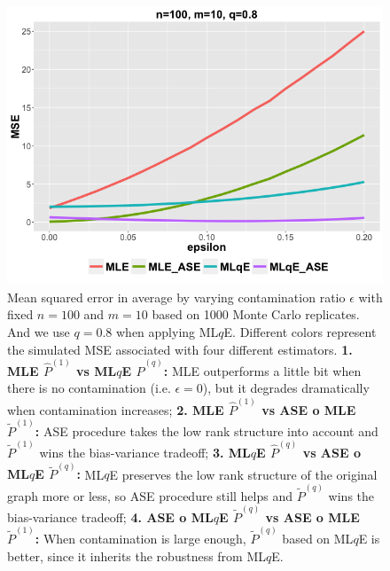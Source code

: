 \documentclass[a4paper]{article}
\begin{document}
\begin{figure}[!htb]
\centering
\includegraphics[width=1\textwidth]{eps.png}
\caption{Mean squared error in average by varying contamination ratio $\epsilon$ with fixed $n = 100$ and $m = 10$ based on 1000 Monte Carlo replicates. And we use $q=0.8$ when applying ML$q$E.
Different colors represent the simulated MSE associated with four different estimators.
\textbf{1. MLE $\hat{P}^{(1)}$ vs ML$q$E $\hat{P}^{(q)}$:}
MLE outperforms a little bit when there is no contamination (i.e. $\epsilon = 0$), but it degrades dramatically when contamination increases;
\textbf{2. MLE $\hat{P}^{(1)}$ vs ASE o MLE $\widetilde{P}^{(1)}$: }
ASE procedure takes the low rank structure into account and $\widetilde{P}^{(1)}$ wins the bias-variance tradeoff;
\textbf{3. ML$q$E $\hat{P}^{(q)}$ vs ASE o ML$q$E $\widetilde{P}^{(q)}$: }
ML$q$E preserves the low rank structure of the original graph more or less, so ASE procedure still helps and $\widetilde{P}^{(q)}$ wins the bias-variance tradeoff;
\textbf{4. ASE o ML$q$E $\widetilde{P}^{(q)}$ vs ASE o MLE $\widetilde{P}^{(1)}$: }
When contamination is large enough, $\widetilde{P}^{(q)}$ based on ML$q$E is better, since it inherits the robustness from ML$q$E.}
\label{fig:eps}
\end{figure}
\end{document}
